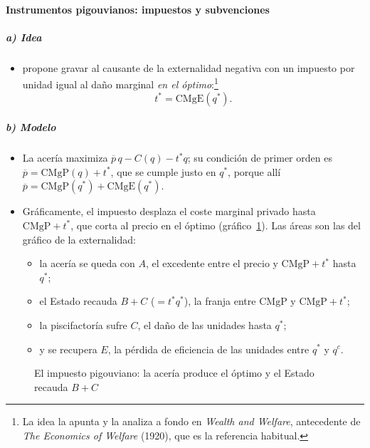 \documentclass[11pt]{article}
\begin{document}
\paragraph{Instrumentos pigouvianos: impuestos y subvenciones}

\subparagraph{a) Idea}
\begin{itemize}
\item \textcite{Pigou1920Economics} propone gravar al causante de la externalidad negativa con un impuesto por unidad igual al daño marginal \emph{en el óptimo}:\footnote{La idea la apunta  y la analiza a fondo \textcite{Pigou1912Wealth} en \emph{Wealth and Welfare}, antecedente de \emph{The Economics of Welfare} (1920), que es la referencia habitual.}
  \begin{equation}\label{eq:pigou}
  t^*=\mathrm{CMgE}(q^*).
  \end{equation}
\end{itemize}

\subparagraph{b) Modelo}
\begin{itemize}
\item La acería maximiza $\overline{p}\,q-C(q)-t^*q$; su condición de primer orden es $\overline{p}=\mathrm{CMgP}(q)+t^*$, que se cumple justo en $q^*$, porque allí $\overline{p}=\mathrm{CMgP}(q^*)+\mathrm{CMgE}(q^*)$.
\item Gráficamente, el impuesto desplaza el coste marginal privado hasta $\mathrm{CMgP}+t^*$, que corta al precio en el óptimo (gráfico~\ref{fig:externalidad-pigou}). Las áreas son las del gráfico de la externalidad:
  \begin{itemize}
  \item la acería se queda con $A$, el excedente entre el precio y $\mathrm{CMgP}+t^*$ hasta $q^*$;
  \item el Estado recauda $B+C$ ($=t^*q^*$), la franja entre $\mathrm{CMgP}$ y $\mathrm{CMgP}+t^*$;
  \item la piscifactoría sufre $C$, el daño de las unidades hasta $q^*$;
  \item y se recupera $E$, la pérdida de eficiencia de las unidades entre $q^*$ y $q^c$.
  \end{itemize}
\end{itemize}

\begin{figure}[H]
\centering
\caption{El impuesto pigouviano: la acería produce el óptimo y el Estado recauda $B+C$}\label{fig:externalidad-pigou}
\end{figure}
\end{document}
